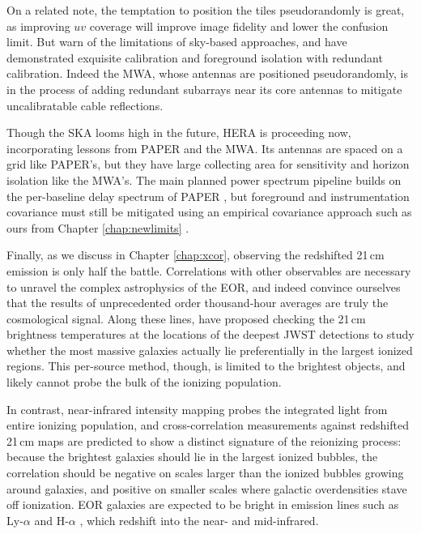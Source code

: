 On a related note, the temptation to position the tiles pseudorandomly is great, as improving $uv$ coverage will improve image fidelity and lower the confusion limit. But \citet{beardsley16,ewallwice16b,barry16} warn of the limitations of sky-based approaches, and \citet{ali15} have demonstrated exquisite calibration and foreground isolation with redundant calibration. Indeed the MWA, whose antennas are positioned pseudorandomly, is in the process of adding redundant subarrays near its core antennas to mitigate uncalibratable cable reflections. 

Though the SKA looms high in the future, HERA is proceeding now, incorporating lessons from PAPER and the MWA. Its antennas are spaced on a grid like PAPER's, but they have large collecting area for sensitivity and horizon isolation like the MWA's. The main planned power spectrum pipeline builds on the per-baseline delay spectrum of PAPER \citep{deboer16,ewallwice16,neben16b,nithya16}, but foreground and instrumentation covariance must still be mitigated using an empirical covariance approach such as ours from Chapter \ref{chap:newlimits} \citep{parsons14,ali15}. 

Finally, as we discuss in Chapter \ref{chap:xcor}, observing the redshifted 21\,cm emission is only half the battle. Correlations with other observables are necessary to unravel the complex astrophysics of the EOR, and indeed convince ourselves that the results of unprecedented order thousand-hour averages are truly the cosmological signal. Along these lines, \citet{beardsley15} have proposed checking the 21\,cm brightness temperatures at the locations of the deepest JWST detections to study whether the most massive galaxies actually lie preferentially in the largest ionized regions. This per-source method, though, is limited to the brightest objects, and likely cannot probe the bulk of the ionizing population. 

In contrast, near-infrared intensity mapping probes the integrated light from entire ionizing population, and cross-correlation measurements against redshifted 21\,cm maps are predicted to show a distinct signature of the reionizing process: because the brightest galaxies should lie in the largest ionized bubbles, the correlation should be negative on scales larger than the ionized bubbles growing around galaxies, and positive on smaller scales where galactic overdensities stave off ionization. EOR galaxies are expected to be bright in emission lines such as Ly-$\alpha$ \citep{primevaltwins} and H-$\alpha$ \citep{brightemissionlines}, which redshift into the near- and mid-infrared.

